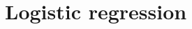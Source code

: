 \documentclass[9pt]{beamer}
\begin{document}
%
%
%
%
%
%
%
%
%
%
%
%
%
%
%
%
%	
%
%
%
%
%
%
%
%
%
%
%
%
%
%
%
%
%
%
%
%
%
%
%
%
%

\section{Logistic regression}
\end{document}
